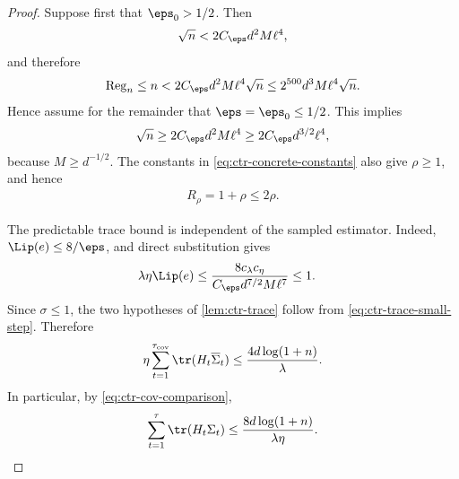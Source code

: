 \begin{proof}
    Suppose first that $\eps_0>1/2$.  Then
    \begin{align}
        \sqrt n<2C_\eps d^2M\ell^4,
    \end{align}
    and therefore
    \begin{align}
        \operatorname{Reg}_n
        \leq n
        <2C_\eps d^2M\ell^4\sqrt n
        \leq2^{500}d^3M\ell^4\sqrt n.
    \end{align}
    Hence assume for the remainder that $\eps=\eps_0\leq1/2$.  This implies
    \begin{align}
        \sqrt n
        \geq2C_\eps d^2M\ell^4
        \geq2C_\eps d^{3/2}\ell^4,
        \label{eq:ctr-large-horizon-consequence}
    \end{align}
    because $M\geq d^{-1/2}$.  The constants in
    \eqref{eq:ctr-concrete-constants} also give $\rho\geq1$, and hence
    \begin{align}
        R_\rho=1+\rho\leq2\rho.
        \label{eq:ctr-R-rho-comparison}
    \end{align}

    The predictable trace bound is independent of the sampled estimator.  Indeed,
    $\Lip(e)\leq8/\eps$, and direct substitution gives
    \begin{align}
        \lambda\eta\Lip(e)
         & \leq
        \frac{8c_\lambda c_\eta}
        {C_\eps d^{7/2}M\ell^7}
        \leq1.
        \label{eq:ctr-trace-small-step}
    \end{align}
    Since $\sigma\leq1$, the two hypotheses of
    \cref{lem:ctr-trace} follow from \eqref{eq:ctr-trace-small-step}.
    Therefore
    \begin{align}
        \eta\sum_{t=1}^{\tau_{\mathrm{cov}}}
        \tr(H_t\overline\Sigma_t)
        \leq\frac{4d\log(1+n)}\lambda.
        \label{eq:ctr-trace-budget}
    \end{align}
    In particular, by \eqref{eq:ctr-cov-comparison},
    \begin{align}
        \sum_{t=1}^{\tau}\tr(H_t\Sigma_t)
        \leq\frac{8d\log(1+n)}{\lambda\eta}.
        \label{eq:ctr-stopped-trace-budget}
    \end{align}


\end{proof}
